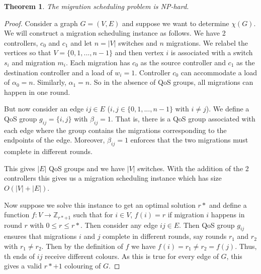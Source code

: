 \documentclass[letterpaper,12pt,titlepage,oneside,final]{article}
\newtheorem{theorem}{Theorem}
\begin{document}
\begin{theorem}
    The migration scheduling problem is NP-hard.
\end{theorem}
\begin{proof}
    Consider a graph $G = (V, E)$ and suppose we want to determine $\chi(G)$. We will construct a migration scheduling instance as follows. We have 2 controllers, $c_{0}$ and $c_{1}$ and let $n = |V|$ switches and $n$ migrations. We relabel the vertices so that $V = \{0, 1, ..., n-1\}$ and then vertex $i$ is associated with a switch $s_{i}$ and migration $m_{i}$. Each migration has $c_{0}$ as the source controller and $c_{1}$ as the destination controller and a load of $w_{i} = 1$. Controller $c_{0}$ can accommodate a load of $\alpha_{0} = n$. Similarly, $\alpha_{1} = n$. So in the absence of QoS groups, all migrations can happen in one round.
    
    But now consider an edge $ij \in E$ ($i, j \in \{0, 1, ..., n - 1\}$ with $i \neq j$). We define a QoS group $g_{ij} = \{i, j\}$ with $\beta_{ij} = 1$. That is, there is a QoS group associated with each edge where the group contains the migrations corresponding to the endpoints of the edge. Moreover, $\beta_{ij} = 1$ enforces that the two migrations must complete in different rounds.
    
    This gives $|E|$ QoS groups and we have $|V|$ switches. With the addition of the 2 controllers this gives us a migration scheduling instance which has size $O(|V| + |E|)$.
    
    Now suppose we solve this instance to get an optimal solution $r*$ and define a function $f: V \rightarrow \mathbb{Z}_{r* + 1}$ such that for $i \in V$, $f(i) = r$ if migration $i$ happens in round $r$ with $0 \leq r \leq r*$. Then consider any edge $ij \in E$. Then QoS group $g_{ij}$ ensures that migrations $i$ and $j$ complete in different rounds, say rounds $r_{1}$ and $r_{2}$ with $r_{1} \neq r_{2}$. Then by the definition of $f$ we have $f(i) = r_{1} \neq r_{2} = f(j)$. Thus, th ends of $ij$ receive different colours. As this is true for every edge of $G$, this gives a valid $r* + 1$ colouring of $G$.
    

\end{proof}
\end{document}

